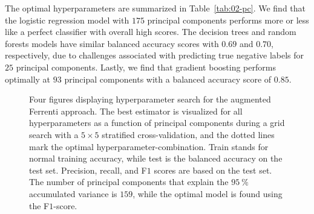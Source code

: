 \documentclass[superscriptaddress,unsortedaddress,
 amsmath,amssymb,
 aps,
]{revtex4-2}
\begin{document}
The optimal hyperparameters are summarized in Table~\ref{tab:02-pc}. We find that the logistic regression model with $175$ principal components performs more or less like a perfect classifier with overall high scores. The decision trees and random forests models have similar balanced accuracy scores with $0.69$ and $0.70$, respectively, due to challenges associated with predicting true negative labels for $25$ principal components. Lastly, we find that gradient boosting performs optimally at $93$ principal components with a balanced accuracy score of $0.85$.

\begin{figure}[ht!]
  \begin{subfigure}[b]{1.0\textwidth}
    \centering
    
  \end{subfigure}
\par\bigskip
  \begin{subfigure}[b]{0.5\textwidth}
    
    \caption{}
    \label{fig:q2-LOG}
  \end{subfigure}%
  \hfill
  \begin{subfigure}[b]{0.5\textwidth}
    
    \caption{}
    \label{fig:q2-DT}
  \end{subfigure}

  \begin{subfigure}[b]{0.5\textwidth}
    
    \caption{}
    \label{fig:q2-RF}
  \end{subfigure}%
  \hfill
  \begin{subfigure}[b]{0.5\textwidth}
    
    \caption{}
    \label{fig:q2-GB}
  \end{subfigure}
  \caption{{Four figures displaying hyperparameter search for the augmented Ferrenti approach. The best estimator is visualized for all hyperparameters as a function of principal components during a grid search with a $5\times5$ stratified cross-validation, and the dotted lines mark the optimal hyperparameter-combination. Train stands for normal training accuracy, while test is the balanced accuracy on the test set. Precision, recall, and F$1$ scores are based on the test set. The number of principal components that explain the $95 \ \%$ accumulated variance is $159$, while the optimal model is found using the F$1$-score.}}
  \label{fig:02-pca}
\end{figure}
\end{document}
